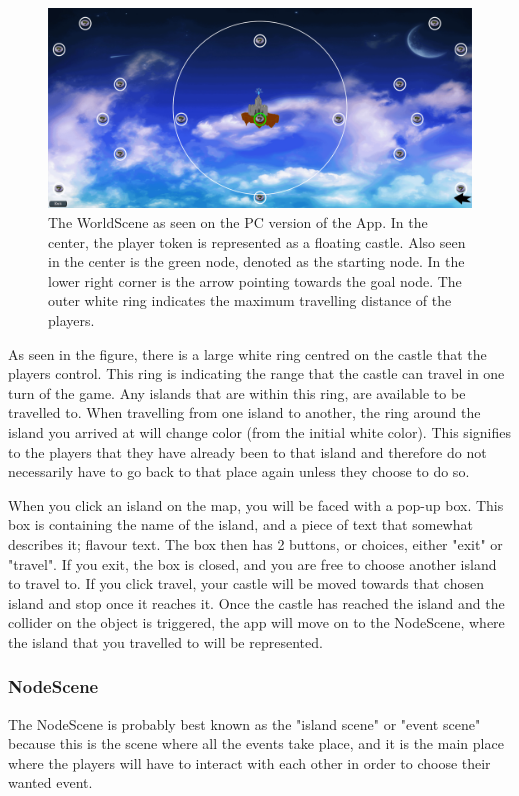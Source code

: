 \begin{figure}[!ht]
    \centering
    \includegraphics[scale=0.3]{Images/WorldScene.png}
    \caption{The WorldScene as seen on the PC version of the App. In the center, the player token is represented as a floating castle. Also seen in the center is the green node, denoted as the starting node. In the lower right corner is the arrow pointing towards the goal node. The outer white ring indicates the maximum travelling distance of the players.}
    \label{fig:worldSc}
\end{figure}

As seen in the figure, there is a large white ring centred on the castle that the players control. This ring is indicating the range that the castle can travel in one turn of the game. Any islands that are within this ring, are available to be travelled to.
When travelling from one island to another, the ring around the island you arrived at will change color (from the initial white color). This signifies to the players that they have already been to that island and therefore do not necessarily have to go back to that place again unless they choose to do so.

When you click an island on the map, you will be faced with a pop-up box. This box is containing the name of the island, and a piece of text that somewhat describes it; flavour text. The box then has 2 buttons, or choices, either "exit" or "travel". If you exit, the box is closed, and you are free to choose another island to travel to. If you click travel, your castle will be moved towards that chosen island and stop once it reaches it. 
Once the castle has reached the island and the collider on the object is triggered, the app will move on to the NodeScene, where the island that you travelled to will be represented.

\subsubsection{NodeScene}
\label{sec:nodeScene}
The NodeScene is probably best known as the "island scene" or "event scene" because this is the scene where all the events take place, and it is the main place where the players will have to interact with each other in order to choose their wanted event.

